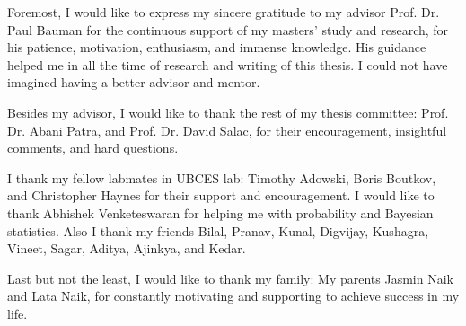  Foremost, I would like to express my sincere gratitude to my advisor Prof. Dr. Paul Bauman for the continuous support of my masters' study and research, for his patience, motivation, enthusiasm, and immense knowledge. His guidance helped me in all the time of research and writing of this thesis. I could not have imagined having a better advisor and mentor.

 Besides my advisor, I would like to thank the rest of my thesis committee: Prof. Dr. Abani Patra,  and Prof. Dr. David Salac, for their encouragement, insightful comments, and hard questions.



 I thank my fellow labmates in UBCES lab: Timothy Adowski, Boris Boutkov, and Christopher Haynes for their support and encouragement. I would like to thank Abhishek Venketeswaran for helping me with probability and Bayesian statistics. Also I thank my friends Bilal, Pranav, Kunal, Digvijay, Kushagra, Vineet, Sagar, Aditya, Ajinkya, and Kedar.


 Last but not the least, I would like to thank my family: My parents Jasmin Naik and Lata Naik, for constantly motivating and supporting to achieve success in my life. 